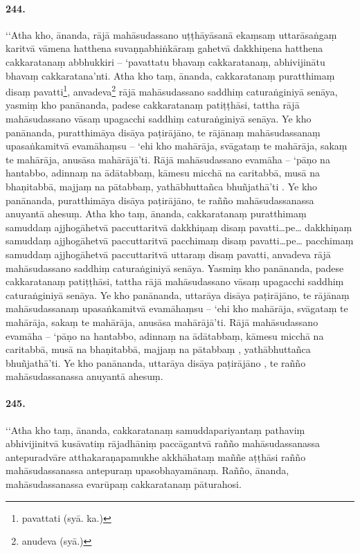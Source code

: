 \paragraph{244.} ‘‘Atha kho, ānanda, rājā mahāsudassano uṭṭhāyāsanā ekaṃsaṃ uttarāsaṅgaṃ karitvā vāmena hatthena suvaṇṇabhiṅkāraṃ gahetvā dakkhiṇena hatthena cakkaratanaṃ abbhukkiri – ‘pavattatu bhavaṃ cakkaratanaṃ, abhivijinātu bhavaṃ cakkaratana’nti. Atha kho taṃ, ānanda, cakkaratanaṃ puratthimaṃ disaṃ pavatti\footnote{pavattati (syā. ka.)}, anvadeva\footnote{anudeva (syā.)} rājā mahāsudassano saddhiṃ caturaṅginiyā senāya, yasmiṃ kho panānanda, padese cakkaratanaṃ patiṭṭhāsi, tattha rājā mahāsudassano vāsaṃ upagacchi saddhiṃ caturaṅginiyā senāya. Ye kho panānanda, puratthimāya disāya paṭirājāno, te rājānaṃ mahāsudassanaṃ upasaṅkamitvā evamāhaṃsu – ‘ehi kho mahārāja, svāgataṃ te mahārāja, sakaṃ te mahārāja, anusāsa mahārājā’ti. Rājā mahāsudassano evamāha – ‘pāṇo na hantabbo, adinnaṃ na ādātabbaṃ, kāmesu micchā na caritabbā, musā na bhaṇitabbā, majjaṃ na pātabbaṃ, yathābhuttañca bhuñjathā’ti . Ye kho panānanda, puratthimāya disāya paṭirājāno, te rañño mahāsudassanassa anuyantā ahesuṃ. Atha kho taṃ, ānanda, cakkaratanaṃ puratthimaṃ samuddaṃ ajjhogāhetvā paccuttaritvā dakkhiṇaṃ disaṃ pavatti…pe… dakkhiṇaṃ samuddaṃ ajjhogāhetvā paccuttaritvā pacchimaṃ disaṃ pavatti…pe… pacchimaṃ samuddaṃ ajjhogāhetvā paccuttaritvā uttaraṃ disaṃ pavatti, anvadeva rājā mahāsudassano saddhiṃ caturaṅginiyā senāya. Yasmiṃ kho panānanda, padese cakkaratanaṃ patiṭṭhāsi, tattha rājā mahāsudassano vāsaṃ upagacchi saddhiṃ caturaṅginiyā senāya. Ye kho panānanda, uttarāya disāya paṭirājāno, te rājānaṃ mahāsudassanaṃ upasaṅkamitvā evamāhaṃsu – ‘ehi kho mahārāja, svāgataṃ te mahārāja, sakaṃ te mahārāja, anusāsa mahārājā’ti. Rājā mahāsudassano evamāha – ‘pāṇo na hantabbo, adinnaṃ na ādātabbaṃ, kāmesu micchā na caritabbā, musā na bhaṇitabbā, majjaṃ na pātabbaṃ , yathābhuttañca bhuñjathā’ti. Ye kho panānanda, uttarāya disāya paṭirājāno , te rañño mahāsudassanassa anuyantā ahesuṃ.

\paragraph{245.} ‘‘Atha kho taṃ, ānanda, cakkaratanaṃ samuddapariyantaṃ pathaviṃ abhivijinitvā kusāvatiṃ rājadhāniṃ paccāgantvā rañño mahāsudassanassa antepuradvāre atthakaraṇapamukhe akkhāhataṃ maññe aṭṭhāsi rañño mahāsudassanassa antepuraṃ upasobhayamānaṃ. Rañño, ānanda, mahāsudassanassa evarūpaṃ cakkaratanaṃ pāturahosi.

